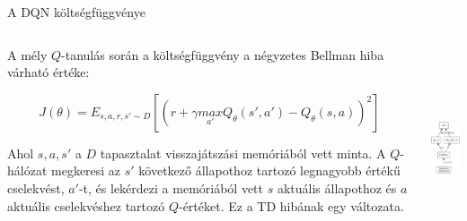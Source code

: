 \documentclass[english, aspectratio=169]{beamer}
\begin{document}
\begin{frame}{A DQN költségfüggvénye}
\begin{columns}
\begin{column}{.75\textwidth}
A mély $Q$-tanulás során a költségfüggvény a négyzetes Bellman hiba várható értéke:
\begin{block}{}
\[
J(\theta) = E_{s,a,r,s' \sim D} \left[ \left( r + \gamma \underset{a'}{max} Q_\theta(s',a') - Q_\theta(s,a) \right)^2 \right]
\]
\end{block}	
Ahol $s,a,s'$ a $D$ tapasztalat visszajátszási memóriából vett minta. A $Q$-hálózat megkeresi az $s'$ következő állapothoz tartozó legnagyobb értékű cselekvést, $a'$-t, és lekérdezi a memóriából vett $s$ aktuális állapothoz és $a$ aktuális cselekvéshez tartozó $Q$-értéket. Ez a TD hibának egy változata.  
\end{column}
\begin{column}{.25\textwidth}
\begin{center}
\includegraphics[height=6cm, keepaspectratio]{graphs/dql_1.png}
\end{center}
\end{column}
\end{columns}
\end{frame}
\end{document}
